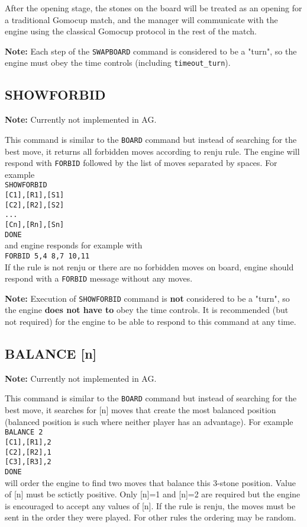 \documentclass[12pt,a4paper]{article}
\begin{document}
After the opening stage, the stones on the board will be treated as an opening for a traditional Gomocup match, and the manager will communicate with the engine using the classical Gomocup protocol in the rest of the match.

\textbf{Note:} Each step of the \texttt{SWAPBOARD} command is considered to be a "turn", so the engine must obey the time controls (including \texttt{timeout{\_}turn}).


\subsection{SHOWFORBID}
\label{cmd_showforbid}
\textbf{Note:} Currently not implemented in AG.

This command is similar to the \texttt{BOARD} command but instead of searching for the best move, it returns all forbidden moves according to renju rule. The engine will respond with \texttt{FORBID} followed by the list of moves separated by spaces. For example\\
\texttt{SHOWFORBID}\\
\texttt{[C1],[R1],[S1]} \\
\texttt{[C2],[R2],[S2]} \\
\texttt{...}\\
\texttt{[Cn],[Rn],[Sn]} \\
\texttt{DONE}\\
and engine responds for example with\\
\texttt{FORBID 5,4 8,7 10,11}\\
If the rule is not renju or there are no forbidden moves on board, engine should respond with a \texttt{FORBID} message without any moves.

\textbf{Note:} Execution of \texttt{SHOWFORBID} command is \textbf{not} considered to be a "turn", so the engine \textbf{does not have to} obey the time controls. It is recommended (but not required) for the engine to be able to respond to this command at any time.


\subsection{BALANCE [n]}
\label{cmd_balance}
\textbf{Note:} Currently not implemented in AG.

This command is similar to the \texttt{BOARD} command but instead of searching for the best move, it searches for [n] moves that create the most balanced position (balanced position is such where neither player has an advantage). For example\\
\texttt{BALANCE 2} \\
\texttt{[C1],[R1],2} \\
\texttt{[C2],[R2],1} \\
\texttt{[C3],[R3],2} \\
\texttt{DONE}\\
will order the engine to find two moves that balance this 3-stone position. Value of [n] must be sctictly positive. Only [n]=1 and [n]=2 are required but the engine is encouraged to accept any values of [n]. If the rule is renju, the moves must be sent in the order they were played. For other rules the ordering may be random.
\end{document}
